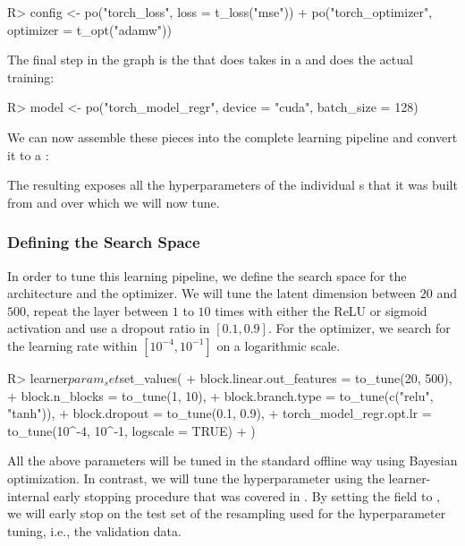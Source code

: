 \documentclass[article]{jss}
\theoremstyle{definition}
\begin{document}
\begin{CodeInput}
R> config <- po("torch_loss", loss = t_loss("mse")) %
+    po("torch_optimizer", optimizer = t_opt("adamw"))
\end{CodeInput}

The final step in the graph is the  that does takes in a  and does the actual training:

\begin{CodeInput}
R> model <- po("torch_model_regr", device = "cuda", batch_size = 128)
\end{CodeInput}

We can now assemble these pieces into the complete learning pipeline and convert it to a :


The resulting  exposes all the hyperparameters of the individual s that it was built from and over which we will now tune.

\subsubsection{Defining the Search Space}
In order to tune this learning pipeline, we define the search space for the architecture and the optimizer.
We will tune the latent dimension between $20$ and $500$, repeat the layer between $1$ to $10$ times with either the ReLU or sigmoid activation and use a dropout ratio in $[0.1, 0.9]$.
For the optimizer, we search for the learning rate within $[10^{-4}, 10^{-1}]$ on a logarithmic scale.

\begin{CodeInput}
R> learner$param_set$set_values(
+    block.linear.out_features = to_tune(20, 500),
+    block.n_blocks = to_tune(1, 10),
+    block.branch.type = to_tune(c("relu", "tanh")),
+    block.dropout = to_tune(0.1, 0.9),
+    torch_model_regr.opt.lr = to_tune(10^-4, 10^-1, logscale = TRUE)
+  )
\end{CodeInput}

All the above parameters will be tuned in the standard offline way using Bayesian optimization.
In contrast, we will tune the  hyperparameter using the learner-internal early stopping procedure that was covered in .
By setting the  field to , we will early stop on the test set of the resampling used for the hyperparameter tuning, i.e., the validation data.
\end{document}
